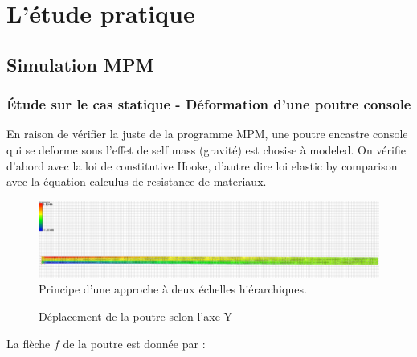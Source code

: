 \documentclass[a4paper,12pt]{report}
\begin{document}


\chapter{L'étude pratique}
\section{Simulation MPM}
\subsection{Étude sur le cas statique - Déformation d'une poutre console}
En raison de vérifier la juste de la programme MPM, une poutre encastre console qui se deforme sous l'effet de self mass (gravité) est chosise à modeled. 
On vérifie d'abord avec la loi de constitutive Hooke, d'autre dire loi elastic by comparison avec la équation calculus de resistance de materiaux.
\begin{figure}[h]
\centering
\includegraphics[height=0.13\textheight]{Model_Poutre.png}
\caption{Principe d’une approche à deux échelles hiérarchiques.\cite{projetderecherche}}
\label{fig:ModelPoutre}
\end{figure}
\begin{figure}[h]
    \centering
    \small
    
    \caption{Déplacement de la poutre selon l’axe Y}
    \label{fig:deplacementPoutre}
\end{figure}

La flèche $f$ de la poutre est donnée par :
\end{document}
